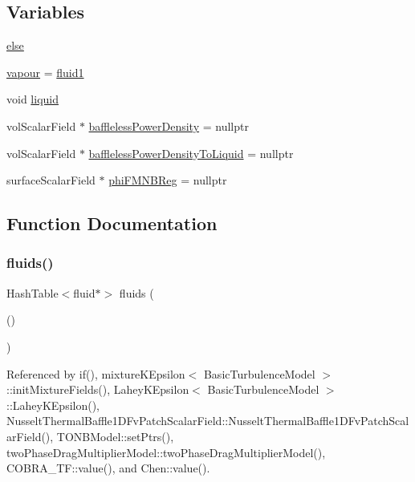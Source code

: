 \subsection*{Variables}
\begin{DoxyCompactItemize}
\item 
\hyperlink{createCouplingFields_8H_a0544c3fe466e421738dae463968b70ba}{else}
\item 
\hyperlink{createCouplingFields_8H_a591ff58ed296dda46a8a5b8321dce5fb}{vapour} = \hyperlink{createCouplingFields_8H_a25f7a0918d80e813426eef4229632ba7}{fluid1}
\item 
void \hyperlink{createCouplingFields_8H_a113830654a80b7f398863f96bf351e05}{liquid}
\item 
vol\+Scalar\+Field $\ast$ \hyperlink{createCouplingFields_8H_af4e3c1de091ffc91c131e672df22b96b}{baffleless\+Power\+Density} = nullptr
\item 
vol\+Scalar\+Field $\ast$ \hyperlink{createCouplingFields_8H_afce01877cad53b14ac949c92809f7621}{baffleless\+Power\+Density\+To\+Liquid} = nullptr
\item 
surface\+Scalar\+Field $\ast$ \hyperlink{createCouplingFields_8H_a48fe00c0cbc444fb8d8e43e0e5ce48bb}{phi\+F\+M\+N\+B\+Reg} = nullptr
\end{DoxyCompactItemize}


\subsection{Function Documentation}
\mbox{\label{createCouplingFields_8H_aab7f3b688fc17e5b6440cb37ca0ea472}} 
\subsubsection{\texorpdfstring{fluids()}{fluids()}}
{\footnotesize\ttfamily Hash\+Table$<$fluid$\ast$$>$ fluids (\begin{DoxyParamCaption}\item[{fluid\+Mesh.\+lookup\+Class$<$ fluid $>$}]{() }\end{DoxyParamCaption})}



Referenced by if(), mixture\+K\+Epsilon$<$ Basic\+Turbulence\+Model $>$\+::init\+Mixture\+Fields(), Lahey\+K\+Epsilon$<$ Basic\+Turbulence\+Model $>$\+::\+Lahey\+K\+Epsilon(), Nusselt\+Thermal\+Baffle1\+D\+Fv\+Patch\+Scalar\+Field\+::\+Nusselt\+Thermal\+Baffle1\+D\+Fv\+Patch\+Scalar\+Field(), T\+O\+N\+B\+Model\+::set\+Ptrs(), two\+Phase\+Drag\+Multiplier\+Model\+::two\+Phase\+Drag\+Multiplier\+Model(), C\+O\+B\+R\+A\+\_\+\+T\+F\+::value(), and Chen\+::value().


